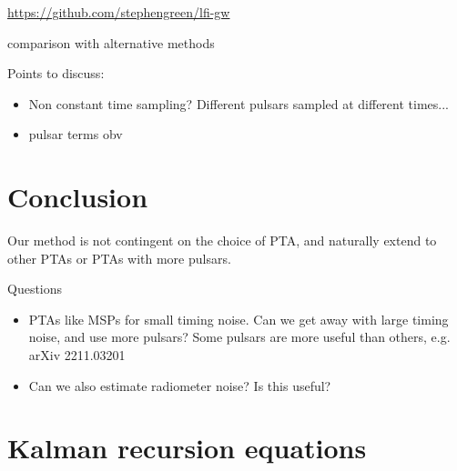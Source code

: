 \documentclass[fleqn,usenatbib,useAMS]{mnras}
\begin{document}
\url{https://github.com/stephengreen/lfi-gw}



comparison with alternative methods



Points to discuss:

\begin{itemize}
	\item Non constant time sampling? Different pulsars sampled at different times...
	\item pulsar terms obv
\end{itemize}

\section{Conclusion}

Our method is not contingent on the choice of PTA, and naturally extend to other PTAs or PTAs with more pulsars. 

Questions 

\begin{itemize}
	\item PTAs like MSPs for small timing noise. Can we get away with large timing noise, and use more pulsars? Some pulsars are more useful than others, e.g. arXiv 2211.03201
	\item Can we also estimate radiometer noise? Is this useful?
\end{itemize}




 \newpage 
\appendix

\section{Kalman recursion equations} \label{sec:kalman}
\end{document}
